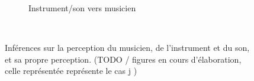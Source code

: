 \begin{figure}[!htbp]
{\begin{subfigure}[b]{.33\textwidth}
			\caption{Instrument/son vers musicien}
		\end{subfigure}%
	}\\
	\caption{Inférences sur la perception du musicien, de l'instrument et du son, et sa propre perception. (TODO / figures en cours d'élaboration, celle représentée représente le cas j )}
	\label{fig:gesture:Inferences}
\end{figure}

